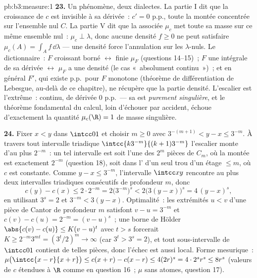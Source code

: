 \begin{solution}{pb:b3:measure:1}
\textbf{23.} Un phénomène, deux dialectes. La partie I dit
que la croissance de $c$ est invisible à sa dérivée~: $c' =
0$ p.p., toute la montée concentrée sur l'ensemble nul $C$.
La partie V dit que la  associée $\mu_c$ met toute sa
masse sur ce même ensemble nul~: $\mu_c \perp \lambda$,
donc aucune densité $f \geq 0$ ne peut satisfaire $\mu_c(A)
= \int_Af\,\dd\lambda$ --- une densité force l'annulation
sur les $\lambda$-nuls. Le dictionnaire~: $F$ croissant
borné $\leftrightarrow$  finie $\mu_F$ (questions
14--15)~; $F$ une intégrale de sa dérivée $\leftrightarrow$
$\mu_F$ a une densité (le cas «~absolument continu~»)~; et
en général $F'$, qui existe p.p.\ pour $F$ monotone
(théorème de différentiation de Lebesgue, au-delà de ce
chapitre), ne récupère que la partie densité. L'escalier
est l'extrême~: continu, de dérivée $0$ p.p.\ --- sa 
est \emph{purement singulière}, et le théorème fondamental
du calcul, loin d'échouer par accident, échoue d'exactement
la quantité $\mu_c(\R) = 1$ de masse singulière.

\textbf{24.} Fixer $x < y$ dans $\intcc01$ et choisir $m
\geq 0$ avec $3^{-(m+1)} < y - x \leq 3^{-m}$. À travers
tout intervalle triadique
$\intcc{k3^{-m}}{(k+1)3^{-m}}$ l'escalier monte d'au plus
$2^{-m}$~: un tel intervalle est soit l'une des $2^m$ pièces
de $C_m$, où la montée est exactement $2^{-m}$ (question
18), soit  dans l' d'un seul trou d'un étage
$\leq m$, où $c$ est constante. Comme $y - x \leq 3^{-m}$,
l'intervalle $\intcc xy$ rencontre au plus deux intervalles
triadiques consécutifs de profondeur $m$, donc
\[
c(y) - c(x) \leq 2\cdot2^{-m}
= 2\bigl(3^{-m}\bigr)^{s}
< 2\bigl(3(y - x)\bigr)^{s}
= 4\,(y - x)^{s},
\]
en utilisant $3^{s} = 2$ et $3^{-m} < 3(y - x)$. Optimalité~:
les extrémités $u < v$ d'une pièce de Cantor de profondeur
$m$ satisfont $v - u = 3^{-m}$ et $c(v) - c(u) = 2^{-m} =
(v - u)^{s}$~; une borne de Hölder $\abs{c(v) - c(u)} \leq
K(v - u)^{t}$ avec $t > s$ forcerait $K \geq 2^{-m}3^{mt} =
(3^{t}/2)^{m} \to \infty$ (car $3^{t} > 3^{s} = 2$), et
tout sous-intervalle de $\intcc01$ contient de telles
pièces, donc l'échec est aussi local. Forme mesurique~:
$\mu\bigl(\intcc{x-r}{x+r}\bigr) \leq c(x + r) - c(x - r)
\leq 4(2r)^{s} = 4\cdot2^{s}r^{s} \leq 8r^{s}$ (valeurs de
$c$ étendues à $\R$ comme en question 16~; $\mu$ sans
atomes, question 17).


\end{solution}
